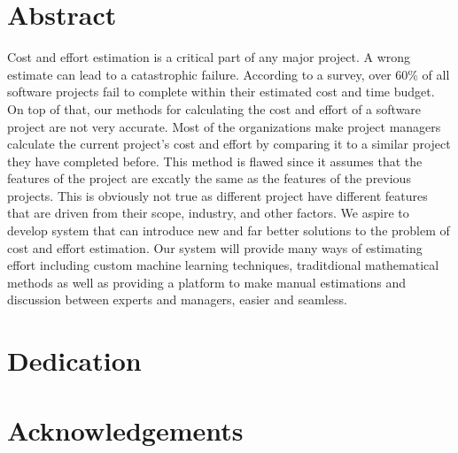 \section*{Abstract}
Cost and effort estimation is a critical part of any major project. A wrong estimate can lead to a catastrophic failure. According to a survey, over 60\% of all software projects fail to complete within their estimated cost and time budget. On top of that, our methods for calculating the cost and effort of a software project are not very accurate. Most of the organizations make project managers calculate the current project's cost and effort by comparing it to a similar project they have completed before. This method is flawed since it assumes that the features of the project are excatly the same as the features of the previous projects. This is obviously not true as different project have different features that are driven from their scope, industry, and other factors. We aspire to develop system that can introduce new and far better solutions to the problem of cost and effort estimation. Our system will provide many ways of estimating effort including custom machine learning techniques, traditdional mathematical methods as well as providing a platform to make manual estimations and discussion between experts and managers, easier and seamless.

\newpage


\section*{Dedication}
\blindtext
\newpage


\section*{Acknowledgements}
\blindtext
\newpage

